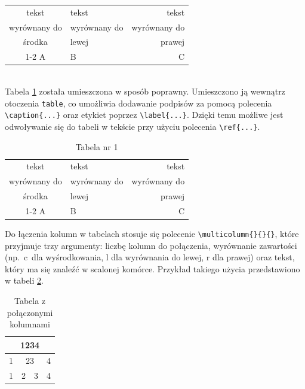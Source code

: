 \documentclass[12pt,a4paper,twoside]{report}
\theoremstyle{definition} %
\begin{document}
	\begin{tabular}{|c|l|r|}
		\hline
		tekst & tekst& tekst\\
		wyrównany do & 	wyrównany do& 	wyrównany do\\
		\hline
		środka& lewej& prawej\\
		\cline{1-2}
		A& B& C\\
		\hline
		\hline
	\end{tabular}\\
	


Tabela \ref{tabela1} została umieszczona w sposób poprawny. Umieszczono ją wewnątrz otoczenia \texttt{table}, co umożliwia dodawanie podpisów za pomocą polecenia \verb|\caption{...}| oraz etykiet poprzez \verb|\label{...}|. Dzięki temu możliwe jest odwoływanie się do tabeli w tekście przy użyciu polecenia \verb|\ref{...}|.
    
	\begin{table}[h!]
		\begin{center}
        \caption{Tabela nr 1}
			\begin{tabular}{|c|l|r|}
				\hline
				tekst & tekst& tekst\\
				wyrównany do & 	wyrównany do& 	wyrównany do\\
				\hline
				środka& lewej& prawej\\
				\cline{1-2}
				A& B& C\\
				\hline
				\hline
			\end{tabular}
			\label{tabela1}
		\end{center}
	\end{table}
	
	\newpage
	Do łączenia kolumn w tabelach stosuje się polecenie \verb|\multicolumn{}{}{}|, które przyjmuje trzy argumenty: liczbę kolumn do połączenia, wyrównanie zawartości (np.~c~dla wyśrodkowania, l dla wyrównania do lewej, r dla prawej) oraz tekst, który ma się znaleźć w scalonej komórce. Przykład takiego użycia przedstawiono w tabeli \ref{laczenie kolumn}.
    
    
	
	\begin{table}[h!]
		\begin{center}
            \caption{Tabela z połączonymi kolumnami}
			\begin{tabular}{|c|c|c|c|}
				\hline
				\multicolumn{4}{|c|}{1234} \\ \hline
				1& \multicolumn{2}{|c|}{23} & 4 \\ \hline
				1& 2& 3& 4\\ \hline	
			\end{tabular}
			\label{laczenie kolumn}
		\end{center}
	\end{table}
\end{document}
